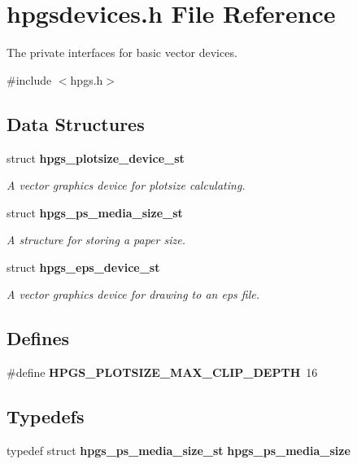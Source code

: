 \section{hpgsdevices.h File Reference}
\label{hpgsdevices_8h}


The private interfaces for basic vector devices.  


{\ttfamily \#include $<$hpgs.h$>$}\par
\subsection*{Data Structures}
\begin{DoxyCompactItemize}
\item 
struct {\bf hpgs\_\-plotsize\_\-device\_\-st}
\begin{DoxyCompactList}\small\item\em A vector graphics device for plotsize calculating. \item\end{DoxyCompactList}\item 
struct {\bf hpgs\_\-ps\_\-media\_\-size\_\-st}
\begin{DoxyCompactList}\small\item\em A structure for storing a paper size. \item\end{DoxyCompactList}\item 
struct {\bf hpgs\_\-eps\_\-device\_\-st}
\begin{DoxyCompactList}\small\item\em A vector graphics device for drawing to an eps file. \item\end{DoxyCompactList}\end{DoxyCompactItemize}
\subsection*{Defines}
\begin{DoxyCompactItemize}
\item 
\#define {\bfseries HPGS\_\-PLOTSIZE\_\-MAX\_\-CLIP\_\-DEPTH}~16\label{group__device_gae92b44de322e9c1b9fbd0f732aea9077}

\end{DoxyCompactItemize}
\subsection*{Typedefs}
\begin{DoxyCompactItemize}
\item 
typedef struct {\bf hpgs\_\-ps\_\-media\_\-size\_\-st} {\bfseries hpgs\_\-ps\_\-media\_\-size}\label{group__device_ga9bbe4ba684b8a07c23d89ee820f00574}

\end{DoxyCompactItemize}
